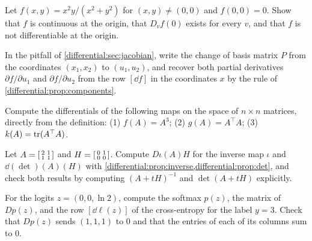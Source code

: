 \begin{notechapter}
\begin{exercise}\label{differential:exr:3}
Let $f(x, y) = x^2y/(x^2 + y^2)$ for $(x, y)\neq(0, 0)$ and
$f(0, 0) = 0$. Show that $f$ is continuous at the origin, that $D_vf(0)$
exists for every $v$, and that $f$ is not differentiable at the origin.
\end{exercise}

\begin{exercise}\label{differential:exr:4}
In the pitfall of \cref{differential:sec:jacobian}, write the change of
basis matrix $P$ from the coordinates $(x_1, x_2)$ to $(u_1, u_2)$, and
recover both partial derivatives $\partial f/\partial u_1$ and
$\partial f/\partial u_2$ from the row $[\dd f]$ in the coordinates $x$
by the rule of \cref{differential:prop:components}.
\end{exercise}

\begin{exercise}\label{differential:exr:5}
Compute the differentials of the following maps on the space of
$n\times n$ matrices, directly from the definition:
(1) $f(A) = A^3$; (2) $g(A) = A^\top A$; (3) $k(A) = \operatorname{tr}(A^\top A)$.
\end{exercise}

\begin{exercise}\label{differential:exr:6}
Let $A = \begin{bsmallmatrix}2 & 1\\1 & 1\end{bsmallmatrix}$ and
$H = \begin{bsmallmatrix}0 & 1\\0 & 0\end{bsmallmatrix}$. Compute
$D\iota(A)H$ for the inverse map $\iota$ and $\dd(\det)(A)(H)$ with
\cref{differential:prop:inverse,differential:prop:det}, and check both
results by computing $(A + tH)^{-1}$ and $\det(A + tH)$ explicitly.
\end{exercise}

\begin{exercise}\label{differential:exr:7}
For the logits $z = (0, 0, \ln2)$, compute the softmax $p(z)$, the matrix
of $Dp(z)$, and the row $[\dd\ell(z)]$ of the cross-entropy for the label
$y = 3$. Check that $Dp(z)$ sends $(1, 1, 1)$ to $0$ and that the entries
of each of its columns sum to $0$.
\end{exercise}


\end{notechapter}
